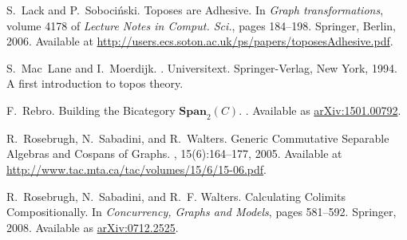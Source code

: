 \documentclass[11pt]{amsart}
\theoremstyle{remark}
\theoremstyle{definition}
\begin{document}
\begin{thebibliography}{10}
	S.~Lack and P.~Soboci{\'n}ski.
	\newblock Toposes are {A}dhesive.
	\newblock In {\em Graph transformations}, volume 4178 of {\em Lecture Notes in
		Comput. Sci.}, pages 184--198. Springer, Berlin, 2006.
	\newblock Available at
	{\href{http://users.ecs.soton.ac.uk/ps/papers/toposesAdhesive.pdf}{http://users.ecs.soton.ac.uk/ps/papers/toposesAdhesive.pdf}}.
	
	S.~Mac~Lane and I.~Moerdijk.
	.
	\newblock Universitext. Springer-Verlag, New York, 1994.
	\newblock A first introduction to topos theory.
	
	F.~Rebro.
	\newblock Building the {B}icategory {$\textbf{Span}_2 (C)$}.
	.
	\newblock Available as
	\href{https://arxiv.org/abs/1501.00792}{arXiv:1501.00792}.
	
	R.~Rosebrugh, N.~Sabadini, and R.~Walters.
	\newblock Generic {C}ommutative {S}eparable {A}lgebras and {C}ospans of
	{G}raphs.
	, 15(6):164--177, 2005.
	\newblock Available at
	\href{http://www.tac.mta.ca/tac/volumes/15/6/15-06.pdf}{http://www.tac.mta.ca/tac/volumes/15/6/15-06.pdf}.
	
	R.~Rosebrugh, N.~Sabadini, and R.~F. Walters.
	\newblock Calculating {C}olimits {C}ompositionally.
	\newblock In {\em Concurrency, Graphs and Models}, pages 581--592. Springer,
	2008.
	\newblock Available as \href{https://arxiv.org/abs/0712.2525}{arXiv:0712.2525}.
	
\end{thebibliography}


%
%
\end{document}
